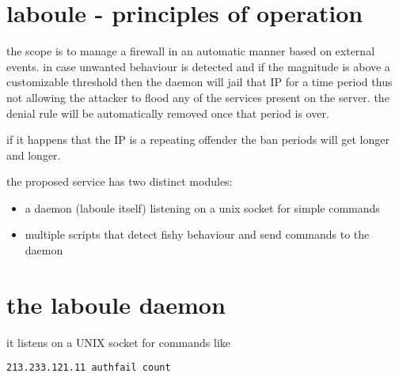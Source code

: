 \documentclass[12pt,twoside,a4paper,titlepage]{report}
\begin{document}
 


\fancyhf{}

\fancyhead{} %
\fancyhead[LO]{\rightmark }
\fancyhead[RE]{\leftmark }
\fancyhead[LE,RO]{\thepage }




\section{laboule - principles of operation}

the scope is to manage a firewall in an automatic manner based on external events. in case unwanted behaviour is detected and if the magnitude is above a customizable threshold then the daemon will jail that IP for a time period thus not allowing the attacker to flood any of the services present on the server. the denial rule will be automatically removed once that period is over. 

if it happens that the IP is a repeating offender the ban periods will get longer and longer.

the proposed service has two distinct modules: 
\begin{itemize}
    \item a daemon (laboule itself) listening on a unix socket for simple commands
    \item multiple scripts that detect fishy behaviour and send commands to the daemon
\end{itemize}

\section{the laboule daemon}

it listens on a UNIX socket for commands like
\begin{verbatim}
213.233.121.11 authfail count
\end{verbatim}
\end{document}

